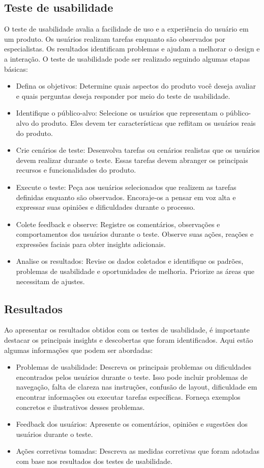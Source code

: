 \documentclass[12pt]{article}
\begin{document}
\subsection{Teste de usabilidade}
O teste de usabilidade avalia a facilidade de uso e a experiência do usuário em um produto. Os usuários realizam tarefas enquanto são observados por especialistas. Os resultados identificam problemas e ajudam a melhorar o design e a interação. O teste de usabilidade pode ser realizado seguindo algumas etapas básicas:
\begin{itemize}
   \item Defina os objetivos: Determine quais aspectos do produto você deseja avaliar e quais perguntas deseja responder por meio do teste de usabilidade.
   \item  Identifique o público-alvo: Selecione os usuários que representam o público-alvo do produto. Eles devem ter características que reflitam os usuários reais do produto.
    \item Crie cenários de teste: Desenvolva tarefas ou cenários realistas que os usuários devem realizar durante o teste. Essas tarefas devem abranger os principais recursos e funcionalidades do produto.
    \item Execute o teste: Peça aos usuários selecionados que realizem as tarefas definidas enquanto são observados. Encoraje-os a pensar em voz alta e expressar suas opiniões e dificuldades durante o processo.
    \item Colete feedback e observe: Registre os comentários, observações e comportamentos dos usuários durante o teste. Observe suas ações, reações e expressões faciais para obter insights adicionais.
    \item Analise os resultados: Revise os dados coletados e identifique os padrões, problemas de usabilidade e oportunidades de melhoria. Priorize as áreas que necessitam de ajustes.
\end{itemize}
\subsection{Resultados}
Ao apresentar os resultados obtidos com os testes de usabilidade, é importante destacar os principais insights e descobertas que foram identificados. Aqui estão algumas informações que podem ser abordadas:
\begin{itemize}
    \item Problemas de usabilidade: Descreva os principais problemas ou dificuldades encontrados pelos usuários durante o teste. Isso pode incluir problemas de navegação, falta de clareza nas instruções, confusão de layout, dificuldade em encontrar informações ou executar tarefas específicas. Forneça exemplos concretos e ilustrativos desses problemas.
    \item Feedback dos usuários: Apresente os comentários, opiniões e sugestões dos usuários durante o teste. 
    \item Ações corretivas tomadas: Descreva as medidas corretivas que foram adotadas com base nos resultados dos testes de usabilidade.
\end{itemize}
\end{document}
